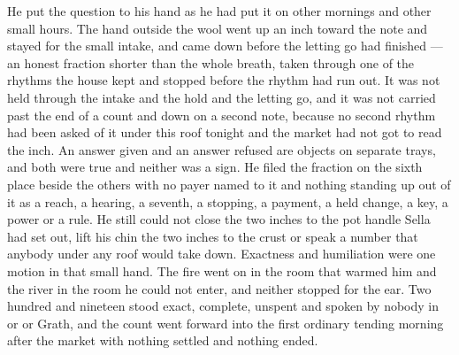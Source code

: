 He put the question to his hand as he had put it on other mornings and other small hours. The hand outside the wool went up an inch toward the note and stayed for the small intake, and came down before the letting go had finished --- an honest fraction shorter than the whole breath, taken through one of the rhythms the house kept and stopped before the rhythm had run out. It was not held through the intake and the hold and the letting go, and it was not carried past the end of a count and down on a second note, because no second rhythm had been asked of it under this roof tonight and the market had not got to read the inch. An answer given and an answer refused are objects on separate trays, and both were true and neither was a sign. He filed the fraction on the sixth place beside the others with no payer named to it and nothing standing up out of it as a reach, a hearing, a seventh, a stopping, a payment, a held change, a key, a power or a rule. He still could not close the two inches to the pot handle Sella had set out, lift his chin the two inches to the crust or speak a number that anybody under any roof would take down. Exactness and humiliation were one motion in that small hand. The fire went on in the room that warmed him and the river in the room he could not enter, and neither stopped for the ear. Two hundred and nineteen stood exact, complete, unspent and spoken by nobody in  or  or Grath, and the count went forward into the first ordinary tending morning after the market with nothing settled and nothing ended.
